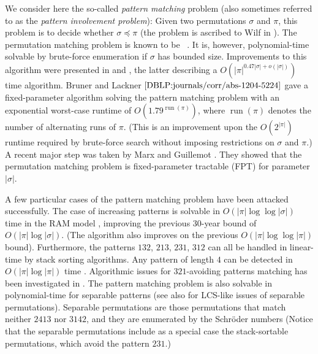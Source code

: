 \documentclass[a4paper]{llncs}
\DeclareMathOperator{\RUN}{run}
\newcounter{num}
\begin{document}
	We consider here the so-called \emph{pattern matching} problem
	(also sometimes referred to as the \emph{pattern involvement problem}):
	Given two permutations $\sigma$ and $\pi$, this problem is to decide whether
	$\sigma \preceq \pi$ (the problem is ascribed to Wilf in \cite{Bose:Buss:Lubiw:1998}).
	The permutation matching problem is known to be \NPhard~\cite{Bose:Buss:Lubiw:1998}.
	It is, however, polynomial-time solvable by brute-force enumeration
	if $\sigma$ has bounded size.
	Improvements to this algorithm were presented in
	\cite{Albert:Aldred:Atkinson:Holton:ISAAC:2001} and
	\cite{Ahal:Rabinovich:2008},
	the latter describing a $O(|\pi|^{0.47|\sigma|+o(|\sigma|)})$ time algorithm.
	Bruner and Lackner $\cite{DBLP:journals/corr/abs-1204-5224}$
	gave a fixed-parameter algorithm solving the pattern matching problem with
	an exponential worst-case runtime of $O(1.79^{\RUN(\pi)})$,
	where $\RUN(\pi)$ denotes the number of alternating runs of $\pi$.
	(This is an improvement upon the $O(2^{|\pi|})$ runtime required by
	brute-force search without imposing restrictions on $\sigma$ and $\pi$.)
	A recent major step was taken by Marx and Guillemot
	\cite{Guillemot:Marx:SODA:2014}.
	They showed that
	the permutation matching problem is fixed-parameter tractable (FPT) for
	parameter $|\sigma|$.

	A few particular cases of the pattern matching problem have been attacked successfully.
	The case of increasing patterns is solvable in
	$O(|\pi| \log \log |\sigma|)$ time in the RAM model \cite{Crochemore:Porat:2010},
	improving the previous 30-year bound of $O(|\pi| \log |\sigma|)$.
	(The algorithm also improves on the previous
	$O(|\pi| \log \log |\pi|)$ bound).
	Furthermore, the patterns $132$, $213$, $231$, $312$ can all be handled in linear-time
	by stack sorting algorithms.
	Any pattern of length $4$ can be detected in $O(|\pi| \log |\pi|)$ time
	\cite{Albert:Aldred:Atkinson:Holton:ISAAC:2001}.
	Algorithmic issues for $321$-avoiding patterns matching has been investigated in
	\cite{Guillemot:Vialette:ISAAC:2009}.
	The pattern matching problem is also solvable in
	polynomial-time for separable patterns \cite{Ibarra:1997,Bose:Buss:Lubiw:1998}
	(see also \cite{Bouvel:Rossin:Vialette:CPM:2007} for LCS-like issues
	of separable permutations).
	Separable permutations are those permutations that match neither
	$2413$ nor $3142$, and they are enumerated by the Schr{\"o}der numbers
	(Notice that the separable permutations include as a special case the
	stack-sortable permutations, which avoid the pattern $231$.)
\end{document}
